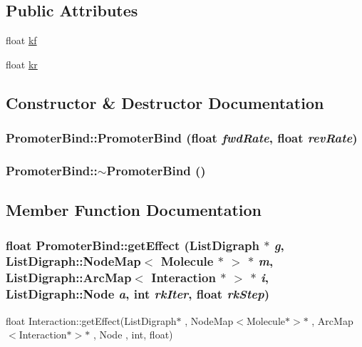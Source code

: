 \subsection*{Public Attributes}
\begin{DoxyCompactItemize}
\item 
float \hyperlink{classPromoterBind_a1d7aec80f269b55174bfb6de07444323}{kf}
\item 
float \hyperlink{classPromoterBind_a8c4425cb2db8caed97296e4a539b93d9}{kr}
\end{DoxyCompactItemize}


\subsection{Constructor \& Destructor Documentation}
\hypertarget{classPromoterBind_a9b26e7c71c89dd80a4943d42d82bee6e}{
\subsubsection[{PromoterBind}]{\setlength{\rightskip}{0pt plus 5cm}PromoterBind::PromoterBind (float {\em fwdRate}, \/  float {\em revRate})}}
\label{classPromoterBind_a9b26e7c71c89dd80a4943d42d82bee6e}
\hypertarget{classPromoterBind_af6e1a9353873574965b23cc4b02b0ac2}{
\subsubsection[{$\sim$PromoterBind}]{\setlength{\rightskip}{0pt plus 5cm}PromoterBind::$\sim$PromoterBind ()}}
\label{classPromoterBind_af6e1a9353873574965b23cc4b02b0ac2}


\subsection{Member Function Documentation}
\hypertarget{classPromoterBind_afadb621f9976cc52d83caec0e8613244}{
\subsubsection[{getEffect}]{\setlength{\rightskip}{0pt plus 5cm}float PromoterBind::getEffect (ListDigraph $\ast$ {\em g}, \/  ListDigraph::NodeMap$<$ {\bf Molecule} $\ast$ $>$ $\ast$ {\em m}, \/  ListDigraph::ArcMap$<$ {\bf Interaction} $\ast$ $>$ $\ast$ {\em i}, \/  ListDigraph::Node {\em a}, \/  int {\em rkIter}, \/  float {\em rkStep})}}
\label{classPromoterBind_afadb621f9976cc52d83caec0e8613244}
float Interaction::getEffect(ListDigraph$\ast$ , NodeMap$<$Molecule$\ast$$>$$\ast$ , ArcMap$<$Interaction$\ast$$>$$\ast$ , Node , int, float)

